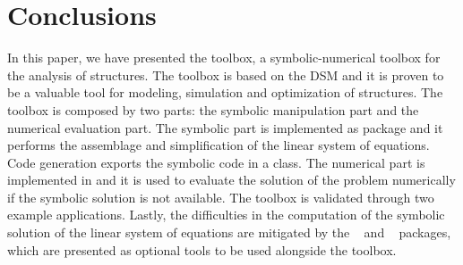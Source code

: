
\section{Conclusions}
\label{chap7:sec:conclusion}

In this paper, we have presented the \TrussMe{} toolbox, a symbolic-numerical toolbox for the analysis of structures. The toolbox is based on the \ac{DSM} and it is proven to be a valuable tool for modeling, simulation and optimization of structures. The toolbox is composed by two parts: the symbolic manipulation part and the numerical evaluation part. The symbolic part is implemented as \Maple{} package and it performs the assemblage and simplification of the linear system of equations. Code generation exports the symbolic code in a \Matlab{} class. The numerical part is implemented in \Matlab{} and it is used to evaluate the solution of the problem numerically if the symbolic solution is not available. The \TrussMe{} toolbox is validated through two example applications. Lastly, the difficulties in the computation of the symbolic solution of the linear system of equations are mitigated by the \LEM{}~\cite{lem} and \LAST{}~\cite{last} \Maple{} packages, which are presented as optional tools to be used alongside the \TrussMe{} toolbox.

